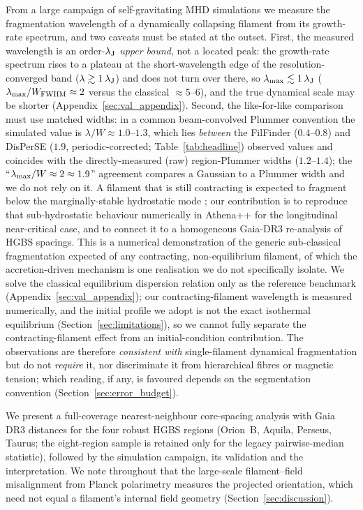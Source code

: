 \documentclass[usenatbib,twoside,twocolumn]{mnras}
\begin{document}
From a large campaign of self-gravitating MHD simulations we measure the fragmentation wavelength of a dynamically collapsing filament from its growth-rate spectrum, and two caveats must be stated at the outset. First, the measured wavelength is an order-$\lambda_{\rm J}$ \emph{upper bound}, not a located peak: the growth-rate spectrum rises to a plateau at the short-wavelength edge of the resolution-converged band ($\lambda\gtrsim1\,\lambda_{\rm J}$) and does not turn over there, so $\lambda_{\rm max}\lesssim1\,\lambda_{\rm J}$ ($\lambda_{\rm max}/W_{\rm FWHM}\approx2$ versus the classical $\approx5$--$6$), and the true dynamical scale may be shorter (Appendix~\ref{sec:val_appendix}). Second, the like-for-like comparison must use matched widths: in a common beam-convolved Plummer convention the simulated value is $\lambda/W\approx1.0$--$1.3$, which lies \emph{between} the FilFinder ($0.4$--$0.8$) and DisPerSE ($1.9$, periodic-corrected; Table~\ref{tab:headline}) observed values and coincides with the directly-measured (raw) region-Plummer widths ($1.2$--$1.4$); the ``$\lambda_{\rm max}/W\approx2\approx1.9$'' agreement compares a Gaussian to a Plummer width and we do not rely on it. A filament that is still contracting is expected to fragment below the marginally-stable hydrostatic mode \citep{Clarke2016,Clarke2017}; our contribution is to reproduce that sub-hydrostatic behaviour numerically in Athena++ for the longitudinal near-critical case, and to connect it to a homogeneous Gaia-DR3 re-analysis of HGBS spacings. This is a numerical demonstration of the generic sub-classical fragmentation expected of any contracting, non-equilibrium filament, of which the accretion-driven \citet{Clarke2016,Clarke2017} mechanism is one realisation we do not specifically isolate. We solve the classical equilibrium dispersion relation only as the reference benchmark (Appendix~\ref{sec:val_appendix}); our contracting-filament wavelength is measured numerically, and the initial profile we adopt is not the exact isothermal equilibrium (Section~\ref{sec:limitations}), so we cannot fully separate the contracting-filament effect from an initial-condition contribution. The observations are therefore \emph{consistent with} single-filament dynamical fragmentation but do not \emph{require} it, nor discriminate it from hierarchical fibres or magnetic tension; which reading, if any, is favoured depends on the segmentation convention (Section~\ref{sec:error_budget}).

We present a full-coverage nearest-neighbour core-spacing analysis with Gaia DR3 distances \citep{Zhang2023} for the four robust HGBS regions (Orion~B, Aquila, Perseus, Taurus; the eight-region sample is retained only for the legacy pairwise-median statistic), followed by the simulation campaign, its validation and the interpretation. We note throughout that the large-scale filament--field misalignment from Planck polarimetry \citep{Planck2016} measures the projected orientation, which need not equal a filament's internal field geometry (Section~\ref{sec:discussion}).
\end{document}
